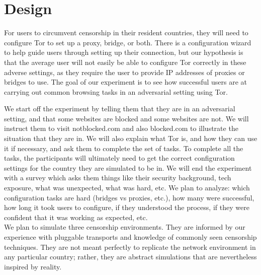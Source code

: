 \documentclass{sig-alternate-hotpets15}
\begin{document}
\section{Design}
For users to circumvent censorship in their resident countries, they will need to configure Tor to set up a proxy, bridge, or both. There is a configuration wizard to help guide users through setting up their connection, but our hypothesis is that the average user will not easily be able to configure Tor correctly in these adverse settings, as they require the user to provide IP addresses of proxies or bridges to use. The goal of our experiment is to see how successful users are at carrying out common browsing tasks in an adversarial setting using Tor. 

We start off the experiment by telling them that they are in an adversarial setting, and that some websites are blocked and some websites are not. We will instruct them to visit notblocked.com and also blocked.com to illustrate the situation that they are in. We will also explain what Tor is, and how they can use it if necessary, and ask them to complete the set of tasks. To complete all the tasks, the participants will ultimately need to get the correct configuration settings for the country they are simulated to be in. We will end the experiment with a survey which asks them things like their security background, tech exposure, what was unexpected, what was hard, etc. We plan to analyze: which configuration tasks are hard (bridges vs proxies, etc.), how many were successful, how long it took users to configure, if they understood the process, if they were confident that it was working as expected, etc. \\

We plan to simulate three censorship environments.
They are informed by our experience with pluggable transports
and knowledge of commonly seen censorship techniques.
They are not meant perfectly to replicate the network environment
in any particular country; rather, they are abstract simulations
that are nevertheless inspired by reality.
\end{document}
